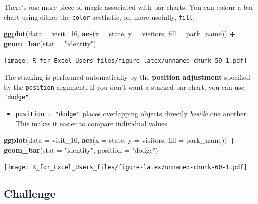 \documentclass[]{book}
\newenvironment{Shaded}{\begin{snugshade}}{\end{snugshade}}
\newcommand{\DataTypeTok}[1]{\textcolor[rgb]{0.13,0.29,0.53}{#1}}
\newcommand{\DecValTok}[1]{\textcolor[rgb]{0.00,0.00,0.81}{#1}}
\newcommand{\KeywordTok}[1]{\textcolor[rgb]{0.13,0.29,0.53}{\textbf{#1}}}
\newcommand{\NormalTok}[1]{#1}
\newcommand{\OperatorTok}[1]{\textcolor[rgb]{0.81,0.36,0.00}{\textbf{#1}}}
\newcommand{\StringTok}[1]{\textcolor[rgb]{0.31,0.60,0.02}{#1}}
\providecommand{\tightlist}{%
  \setlength{\itemsep}{0pt}\setlength{\parskip}{0pt}}
\begin{document}
There's one more piece of magic associated with bar charts. You can colour a bar chart using either the \texttt{color} aesthetic, or, more usefully, \texttt{fill}:

\begin{Shaded}
\begin{Highlighting}[]
\KeywordTok{ggplot}\NormalTok{(}\DataTypeTok{data =}\NormalTok{ visit_}\DecValTok{16}\NormalTok{, }\KeywordTok{aes}\NormalTok{(}\DataTypeTok{x =}\NormalTok{ state, }\DataTypeTok{y =}\NormalTok{ visitors, }\DataTypeTok{fill =}\NormalTok{ park_name)) }\OperatorTok{+}\StringTok{ }
\StringTok{  }\KeywordTok{geom_bar}\NormalTok{(}\DataTypeTok{stat =} \StringTok{"identity"}\NormalTok{)}
\end{Highlighting}
\end{Shaded}

\texttt{[image: R\_for\_Excel\_Users\_files/figure-latex/unnamed-chunk-59-1.pdf]}

The stacking is performed automatically by the \textbf{position adjustment} specified by the \texttt{position} argument. If you don't want a stacked bar chart, you can use \texttt{"dodge"}.

\begin{itemize}
\tightlist
\item
  \texttt{position\ =\ "dodge"} places overlapping objects directly \emph{beside} one
  another. This makes it easier to compare individual values.
\end{itemize}

\begin{Shaded}
\begin{Highlighting}[]
\KeywordTok{ggplot}\NormalTok{(}\DataTypeTok{data =}\NormalTok{ visit_}\DecValTok{16}\NormalTok{, }\KeywordTok{aes}\NormalTok{(}\DataTypeTok{x =}\NormalTok{ state, }\DataTypeTok{y =}\NormalTok{ visitors, }\DataTypeTok{fill =}\NormalTok{ park_name)) }\OperatorTok{+}\StringTok{ }
\StringTok{  }\KeywordTok{geom_bar}\NormalTok{(}\DataTypeTok{stat =} \StringTok{"identity"}\NormalTok{, }\DataTypeTok{position =} \StringTok{"dodge"}\NormalTok{)}
\end{Highlighting}
\end{Shaded}

\texttt{[image: R\_for\_Excel\_Users\_files/figure-latex/unnamed-chunk-60-1.pdf]}

\hypertarget{challenge-1}{%
\subsection{Challenge}\label{challenge-1}}
\end{document}
